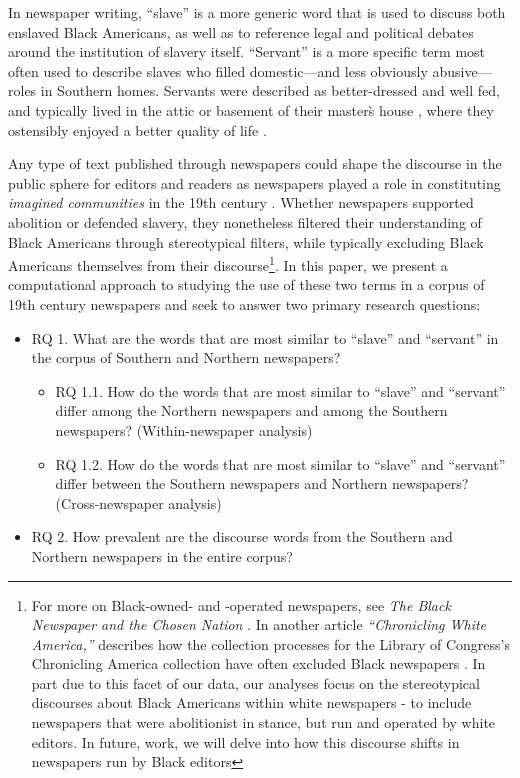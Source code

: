 \documentclass[11pt]{article}
\begin{document}
In newspaper writing, ``slave'' is a more generic word that is used to discuss both enslaved Black Americans, as well as to reference legal and political debates around the institution of slavery itself.
``Servant'' is a more specific term most often used to describe slaves who filled domestic—and less obviously abusive—roles in Southern homes. 
Servants were described as better-dressed and well fed, and typically lived in the attic or basement of their master\`s house \citep{malcolm1990malcolm}, where they ostensibly enjoyed a better quality of life \citep{gatewood2000aristocrats}.

Any type of text published through newspapers could shape the discourse in the public sphere for editors and readers as newspapers played a role in constituting \textit{imagined communities} in the 19th century \citep{anderson2006imagined}. 
Whether newspapers supported abolition or defended slavery, they nonetheless filtered their understanding of Black Americans through stereotypical filters, while typically excluding Black Americans themselves from their discourse\footnote{For more on Black-owned- and -operated newspapers, see \textit{The Black Newspaper and the Chosen Nation} \citep{fagan2016black}.
In another article \textit{``Chronicling White America,''} \citeauthor{fagan2016chronicling} describes how the collection processes for the Library of Congress's Chronicling America collection have often excluded Black newspapers \citep{fagan2016chronicling}. In part due to this facet of our data, our analyses focus on the stereotypical discourses about Black Americans within white newspapers - to include newspapers that were abolitionist in stance, but run and operated by white editors. 
In future, work, we will delve into how this discourse shifts in newspapers run by Black editors}.
In this paper, we present a computational approach to studying the use of these two terms in a corpus of 19th century newspapers and seek to answer two primary research questions:

\begin{itemize}
  \item RQ 1. What are the words that are most similar to ``slave'' and ``servant'' in the corpus of Southern and Northern newspapers?
    \begin{itemize}
      \item RQ 1.1. How do the words that are most similar to ``slave'' and ``servant'' differ among the Northern newspapers and among the Southern newspapers? (Within-newspaper analysis)
      \item RQ 1.2. How do the words that are most similar to ``slave'' and ``servant'' differ between the Southern newspapers and Northern newspapers? (Cross-newspaper analysis)
    \end{itemize}
  \item RQ 2. How prevalent are the discourse words from the Southern and Northern newspapers in the entire corpus? 
\end{itemize}
\end{document}
